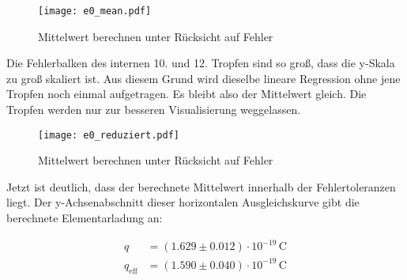 \begin{figure*}
    \texttt{[image: e0\_mean.pdf]}
    \caption{Mittelwert berechnen unter Rücksicht auf Fehler}
\end{figure*}

\noindent Die Fehlerbalken des internen 10. und 12. Tropfen sind so groß, dass die y-Skala zu groß skaliert ist. Aus diesem Grund wird 
dieselbe lineare Regression ohne jene Tropfen noch einmal aufgetragen. Es bleibt also der Mittelwert gleich. Die Tropfen werden nur zur 
besseren Visualisierung weggelassen.

\begin{figure*}
    \texttt{[image: e0\_reduziert.pdf]}
    \caption{Mittelwert berechnen unter Rücksicht auf Fehler}
\end{figure*}

\noindent Jetzt ist deutlich, dass der berechnete Mittelwert innerhalb der Fehlertoleranzen liegt. Der y-Achsenabschnitt dieser horizontalen 
Ausgleichskurve gibt die berechnete Elementarladung an:

\begin{align*}
    q            &= \left(1.629\pm0.012\right)\cdot10^{-19}\,\unit{\coulomb} \\
    q_\text{eff} &= \left(1.590 \pm0.040\right)\cdot10^{-19}\,\unit{\coulomb} 
\end{align*}



%

